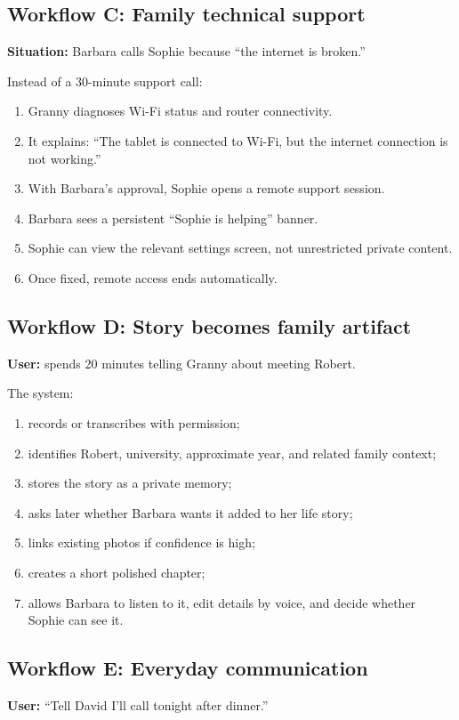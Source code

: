 \documentclass[11pt]{article}
\begin{document}
\subsection{Workflow C: Family technical support}
\textbf{Situation:} Barbara calls Sophie because ``the internet is broken.''

Instead of a 30-minute support call:

\begin{enumerate}[leftmargin=*]
    \item Granny diagnoses Wi-Fi status and router connectivity.
    \item It explains: ``The tablet is connected to Wi-Fi, but the internet connection is not working.''
    \item With Barbara's approval, Sophie opens a remote support session.
    \item Barbara sees a persistent ``Sophie is helping'' banner.
    \item Sophie can view the relevant settings screen, not unrestricted private content.
    \item Once fixed, remote access ends automatically.
\end{enumerate}

\subsection{Workflow D: Story becomes family artifact}
\textbf{User:} spends 20 minutes telling Granny about meeting Robert.

The system:
\begin{enumerate}[leftmargin=*]
    \item records or transcribes with permission;
    \item identifies Robert, university, approximate year, and related family context;
    \item stores the story as a private memory;
    \item asks later whether Barbara wants it added to her life story;
    \item links existing photos if confidence is high;
    \item creates a short polished chapter;
    \item allows Barbara to listen to it, edit details by voice, and decide whether Sophie can see it.
\end{enumerate}

\subsection{Workflow E: Everyday communication}
\textbf{User:} ``Tell David I'll call tonight after dinner.''
\end{document}
